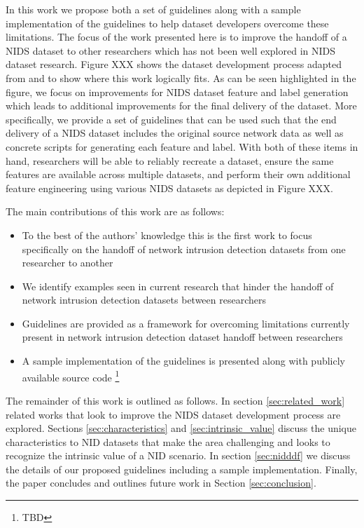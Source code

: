 \documentclass[conference]{IEEEtran}
\begin{document}
In this work we propose both a set of guidelines along with a sample implementation of the guidelines to help dataset developers overcome these limitations.
The focus of the work presented here is to improve the handoff of a NIDS dataset to other researchers which has not been well explored in NIDS dataset research.
Figure XXX shows the dataset development process adapted from \cite{sarhan_arxiv2021} and \cite{e23111532} to show where this work logically fits. 
As can be seen highlighted in the figure, we focus on improvements for NIDS dataset feature and label generation which leads to additional improvements for the final delivery of the dataset.
More specifically, we provide a set of guidelines that can be used such that the end delivery of a NIDS dataset includes the original source network data as well as concrete scripts for generating each feature and label.
With both of these items in hand, researchers will be able to reliably recreate a dataset, ensure the same features are available across multiple datasets, and perform their own additional feature engineering using various NIDS datasets as depicted in Figure XXX.

The main contributions of this work are as follows:

\begin{itemize}
    \item To the best of the authors' knowledge this is the first work to focus specifically on the handoff of network intrusion detection datasets from one researcher to another
    \item We identify examples seen in current research that hinder the handoff of network intrusion detection datasets between researchers
    \item Guidelines are provided as a framework for overcoming limitations currently present in network intrusion detection dataset handoff between researchers
    \item A sample implementation of the guidelines is presented along with publicly available source code \footnote{TBD}
\end{itemize}

The remainder of this work is outlined as follows.
In section \ref{sec:related_work} related works that look to improve the NIDS dataset development process are explored.
Sections \ref{sec:characteristics} and \ref{sec:intrinsic_value} discuss the unique characteristics to NID datasets that make the area challenging and looks to recognize the intrinsic value of a NID scenario.
In section \ref{sec:nidddf} we discuss the details of our proposed guidelines including a sample implementation.
Finally, the paper concludes and outlines future work in Section \ref{sec:conclusion}.
\end{document}
